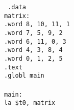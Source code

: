 \documentclass[../main.tex]{subfiles}
\begin{document}
\texttt{
    \hspace*{4mm} .data \\
    \hspace*{4mm} matrix: \\
    \hspace*{4mm} \hspace*{0cm} \hspace*{0cm} \hspace*{0cm} \hspace*{0cm} .word 8, 10, 11, 1 \\
    \hspace*{4mm} \hspace*{0cm} \hspace*{0cm} \hspace*{0cm} \hspace*{0cm} .word 7, 5, 9, 2 \\
    \hspace*{4mm} \hspace*{0cm} \hspace*{0cm} \hspace*{0cm} \hspace*{0cm} .word 6, 11, 0, 3 \\
    \hspace*{4mm} \hspace*{0cm} \hspace*{0cm} \hspace*{0cm} \hspace*{0cm} .word 4, 3, 8, 4 \\
    \hspace*{4mm} \hspace*{0cm} \hspace*{0cm} \hspace*{0cm} \hspace*{0cm} .word 0, 1, 2, 5 \\
    \hspace*{4mm} \hspace*{0cm} \hspace*{0cm} .text \\
    \hspace*{4mm} \hspace*{0cm} \hspace*{0cm} \hspace*{0cm} \hspace*{0cm} .globl main \\
    \\
    \hspace*{4mm} main: \\
    \hspace*{4mm} \hspace*{0cm} \hspace*{0cm} \hspace*{0cm} \hspace*{0cm} la \$t0, matrix \\
}
\end{document}
